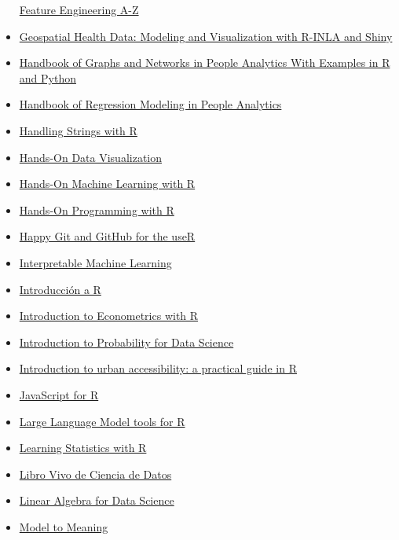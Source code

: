 \documentclass[
]{article}
\begin{document}
\begin{itemize}
  \href{https://feaz-book.com/}{Feature Engineering A-Z}
\item
  \href{http://www.paulamoraga.com/book-geospatial/}{Geospatial Health
  Data: Modeling and Visualization with R-INLA and Shiny}
\item
  \href{https://ona-book.org/}{Handbook of Graphs and Networks in People
  Analytics With Examples in R and Python}
\item
  \href{https://peopleanalytics-regression-book.org/}{Handbook of
  Regression Modeling in People Analytics}
\item
  \href{http://www.gastonsanchez.com/r4strings/}{Handling Strings with
  R}
\item
  \href{https://handsondataviz.org/}{Hands-On Data Visualization}
\item
  \href{https://bradleyboehmke.github.io/HOML/}{Hands-On Machine
  Learning with R}
\item
  \href{https://rstudio-education.github.io/hopr/}{Hands-On Programming
  with R}
\item
  \href{https://happygitwithr.com/}{Happy Git and GitHub for the useR}
\item
  \href{https://christophm.github.io/interpretable-ml-book/}{Interpretable
  Machine Learning}
\item
  \href{https://cran.r-project.org/doc/contrib/R-intro-1.1.0-espanol.1.pdf}{Introducción
  a R}
\item
  \href{https://www.econometrics-with-r.org/}{Introduction to
  Econometrics with R}
\item
  \href{https://probability4datascience.com/index.html}{Introduction to
  Probability for Data Science}
\item
  \href{https://github.com/ipeaGIT/intro_access_book}{Introduction to
  urban accessibility: a practical guide in R}
\item
  \href{https://book.javascript-for-r.com/}{JavaScript for R}
\item
  \href{https://luisdva.github.io/llmsr-book/}{Large Language Model
  tools for R}
\item
  \href{https://learningstatisticswithr.com/}{Learning Statistics with
  R}
\item
  \href{https://librovivodecienciadedatos.ai/}{Libro Vivo de Ciencia de
  Datos}
\item
  \href{https://shainarace.github.io/LinearAlgebra/index.html}{Linear
  Algebra for Data Science}
\item
  \href{https://marginaleffects.com/}{Model to Meaning}

\end{itemize}
\end{document}
